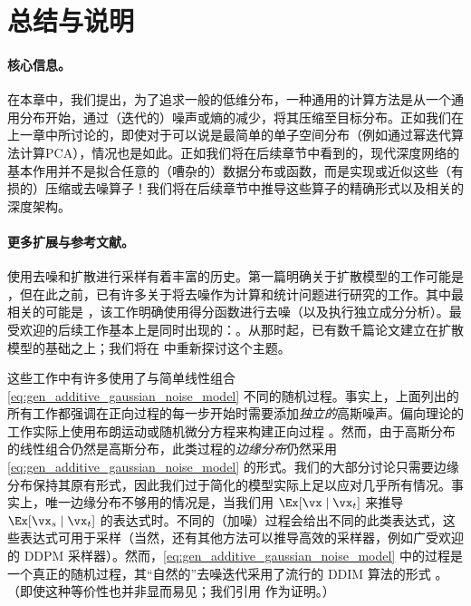 \documentclass[../../book-main_zh.tex]{subfiles}
\begin{document}

\section{总结与说明}
\paragraph{核心信息。}
在本章中，我们提出，为了追求一般的低维分布，一种通用的计算方法是从一个通用分布开始，通过（迭代的）噪声或熵的减少，将其压缩至目标分布。正如我们在上一章中所讨论的，即使对于可以说是最简单的单子空间分布（例如通过幂迭代算法计算PCA），情况也是如此。正如我们将在后续章节中看到的，现代深度网络的基本作用并不是拟合任意的（嘈杂的）数据分布或函数，而是实现或近似这些（有损的）压缩或去噪算子！我们将在后续章节中推导这些算子的精确形式以及相关的深度架构。

\paragraph{更多扩展与参考文献。}
使用去噪和扩散进行采样有着丰富的历史。第一篇明确关于扩散模型的工作可能是 \cite{Sohl-Dickstein2015}，但在此之前，已有许多关于将去噪作为计算和统计问题进行研究的工作。其中最相关的可能是 \cite{hyvarinen05a}，该工作明确使用得分函数进行去噪（以及执行独立成分分析）。最受欢迎的后续工作基本上是同时出现的：\cite{ho2020denoising,song2019}。从那时起，已有数千篇论文建立在扩散模型的基础之上；我们将在  中重新探讨这个主题。

这些工作中有许多使用了与简单线性组合 \eqref{eq:gen_additive_gaussian_noise_model} 不同的随机过程。事实上，上面列出的所有工作都强调在正向过程的每一步开始时需要添加\textit{独立的}高斯噪声。偏向理论的工作实际上使用布朗运动或随机微分方程来构建正向过程 \cite{song2020score}。然而，由于高斯分布的线性组合仍然是高斯分布，此类过程的\textit{边缘分布}仍然采用 \eqref{eq:gen_additive_gaussian_noise_model} 的形式。我们的大部分讨论只需要边缘分布保持其原有形式，因此我们过于简化的模型实际上足以应对几乎所有情况。事实上，唯一边缘分布不够用的情况是，当我们用 \(\Ex[\vx \mid \vx_{t}]\) 来推导 \(\Ex[\vx_{s} \mid \vx_{t}]\) 的表达式时。不同的（加噪）过程会给出不同的此类表达式，这些表达式可用于采样（当然，还有其他方法可以推导高效的采样器，例如广受欢迎的 DDPM 采样器）。然而，\eqref{eq:gen_additive_gaussian_noise_model} 中的过程是一个真正的随机过程，其“自然的”去噪迭代采用了流行的 DDIM 算法的形式 \cite{song2020denoising}。（即使这种等价性也并非显而易见；我们引用 \cite{de2025distributional} 作为证明。）
\end{document}
